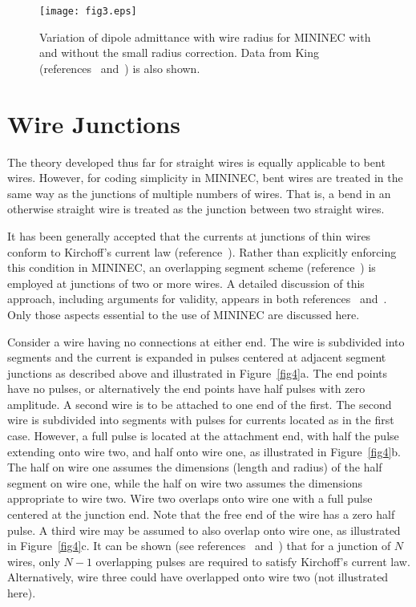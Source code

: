 \documentclass[12pt]{article}
\begin{document}
\begin{sidewaysfigure}[htb]
\centerline{\texttt{[image: fig3.eps]}}
\caption{Variation of dipole admittance with wire radius for MININEC
with and without the small radius correction. Data from King
(references~\cite{r8} and~\cite{r9}) is also shown.}
\label{fig3}
\end{sidewaysfigure}
\afterpage\clearpage

\section{Wire Junctions}
The theory developed thus far for straight wires is equally applicable
to bent wires. However, for coding simplicity in MININEC, bent wires are
treated in the same way as the junctions of multiple numbers of wires.
That is, a bend in an otherwise straight wire is treated as the junction
between two straight wires.

It has been generally accepted that the currents at junctions of thin
wires conform to Kirchoff's current law (reference~\cite{r10}). Rather
than explicitly enforcing this condition in MININEC, an overlapping
segment scheme (reference~\cite{r11}) is employed at junctions of two or
more wires. A detailed discussion of this approach, including arguments
for validity, appears in both references~\cite{r8} and~\cite{r9}. Only
those aspects essential to the use of MININEC are discussed here.

Consider a wire having no connections at either end. The wire is
subdivided into segments and the current is expanded in pulses centered
at adjacent segment junctions as described above and illustrated in
Figure~\ref{fig4}a. The end points have no pulses, or alternatively the
end points have half pulses with zero amplitude. A second wire is to be
attached to one end of the first. The second wire is subdivided into
segments with pulses for currents located as in the first case. However,
a full pulse is located at the attachment end, with half the pulse
extending onto wire two, and half onto wire one, as illustrated in
Figure~\ref{fig4}b. The half on wire one assumes the dimensions (length
and radius) of the half segment on wire one, while the half on wire two
assumes the dimensions appropriate to wire two. Wire two overlaps onto
wire one with a full pulse centered at the junction end. Note that the
free end of the wire has a zero half pulse. A third wire may be assumed
to also overlap onto wire one, as illustrated in Figure~\ref{fig4}c. It can
be shown (see references~\cite{r8} and~\cite{r9}) that for a junction of
$N$ wires, only $N-1$ overlapping pulses are required to satisfy
Kirchoff's current law. Alternatively, wire three could have overlapped
onto wire two (not illustrated here).
\end{document}
